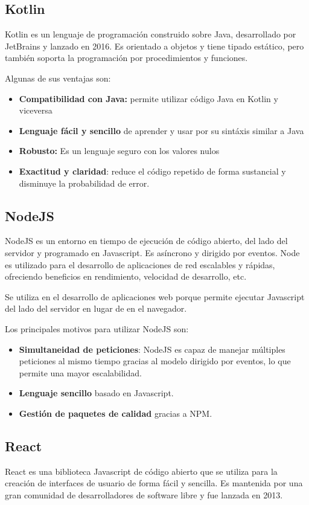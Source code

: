 \subsection{Kotlin}
Kotlin es un lenguaje de programación construido sobre Java, desarrollado por JetBrains y lanzado en 2016.
Es orientado a objetos y tiene tipado estático, pero también soporta la programación por procedimientos y funciones. 

Algunas de sus ventajas son:
\begin{itemize}
\item \textbf{Compatibilidad con Java:} permite utilizar código Java en Kotlin y viceversa
\item \textbf{Lenguaje fácil y sencillo} de aprender y usar por su sintáxis similar a Java
\item \textbf{Robusto:} Es un lenguaje seguro con los valores nulos 
\item \textbf{Exactitud y claridad}: reduce el código repetido de forma sustancial y disminuye la probabilidad de error.

\end{itemize}


\subsection{NodeJS}
NodeJS es un entorno en tiempo de ejecución de código abierto, del lado del servidor y programado en Javascript. 
Es asíncrono y dirigido por eventos. Node es utilizado para el desarrollo de aplicaciones de red escalables y rápidas, ofreciendo beneficios
en rendimiento, velocidad de desarrollo, etc. 

Se utiliza en el desarrollo de aplicaciones web porque permite ejecutar Javascript del lado del servidor en lugar de en el navegador. 

Los principales motivos para utilizar NodeJS son:
\begin{itemize}
    \item \textbf{Simultaneidad de peticiones}: NodeJS es capaz de manejar múltiples peticiones al mismo tiempo gracias al modelo dirigido por eventos, 
    lo que permite una mayor escalabilidad.
    \item \textbf{Lenguaje sencillo} basado en Javascript.
    \item \textbf{Gestión de paquetes de calidad} gracias a NPM.
\end{itemize}


\subsection{React}
React es una biblioteca Javascript de código abierto que se utiliza para la creación de interfaces de usuario de forma fácil y sencilla.
Es mantenida por una gran comunidad de desarrolladores de software libre y fue lanzada en 2013. 

